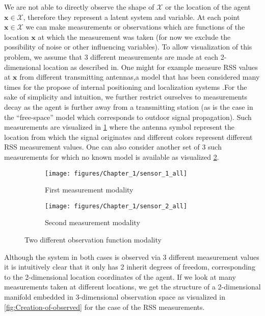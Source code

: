 	We are not able to directly observe the shape of $\mathcal{X}$ or the location of the agent $\mathbf{x}\in\mathcal{X}$, therefore they represent a latent system and variable. At each point $\mathbf{x}\in\mathcal{X}$ we can make measurements or observations which are functions of the location $\mathbf{x}$ at which the measurement was taken (for now we exclude the possibility of noise or other influencing variables). To allow visualization of this problem, we assume that 3 different measurements are made at each 2-dimensional location as described in. One might for example measure \ac{RSS} values at $\mathbf{x}$ from different transmitting antennas,a model that has been considered many times for the propose of internal positioning and localization systems \cite{ash2004sensor, bal2009localization, boukerche2007localization, costa2006distributed, kotaru2015spotfi, moses2003self, niculescu2003ad, patwari2003relative, ramadurai2003localization, yang2009indoor}.For the sake of simplicity and intuition, we further restrict ourselves to measurements decay as the agent is further away from a transmitting station (as is the case in the “free-space” model which corresponds to outdoor signal propagation). Such measurements are visualized in \cref{fig:First-measurement-modality} where the antenna symbol represent the location from which the signal originates and different colors represent different \ac{RSS} measurement values. One can also consider another set of 3 such measurements for which no known model is available as visualized \cref{fig:Second-measurement-modality}.


	\begin{figure}
		\centering
		\begin{subfigure}{.5\textwidth}
			\centering
			\texttt{[image: figures/Chapter\_1/sensor\_1\_all]}
			\caption{First measurement modality\label{fig:First-measurement-modality}}
		\end{subfigure}%
		\begin{subfigure}{.5\textwidth}
			\centering
			\texttt{[image: figures/Chapter\_1/sensor\_2\_all]}
			\caption{Second measurement modality\label{fig:Second-measurement-modality}}
		\end{subfigure}
			\caption{Two different observation function modality\label{fig:test}}
	\end{figure}

		
		
	Although the system in both cases is observed via 3 different measurement values it is intuitively clear that it only has 2 inherit degrees of freedom, corresponding to the 2-dimensional location coordinates of the agent. If we look at many measurements taken at different locations, we get the structure of a 2-dimensional manifold embedded in 3-dimensional observation space as visualized in \cref{fig:Creation-of-observed} for the case of the \ac{RSS} measurements.
		

